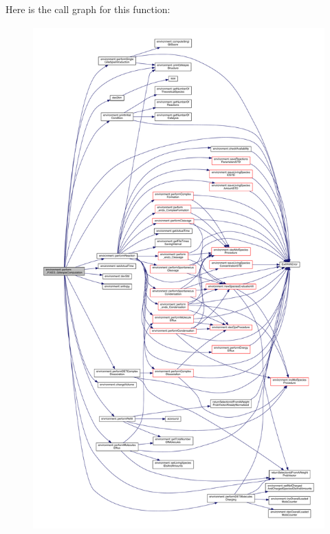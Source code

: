 Here is the call graph for this function\-:\nopagebreak
\begin{figure}[H]
\begin{center}
\leavevmode
\includegraphics[height=550pt]{a00014_aa4fba7d5679a16fd6ef1a9a2041779a2_cgraph}
\end{center}
\end{figure}


